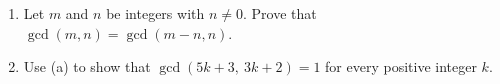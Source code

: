 \begin{enumerate}
\item[(a)] Let $m$ and $n$ be integers with $n\ne0$. Prove that $\gcd(m,n)=\gcd(m-n,n)$.
\item[(b)] Use (a) to show that $\gcd(5k+3,\ 3k+2)=1$ for every positive integer $k$.
\end{enumerate}
